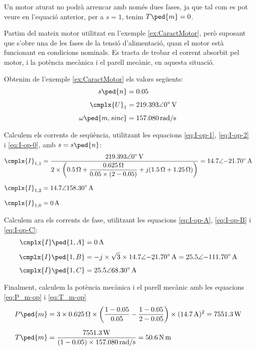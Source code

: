 	    
Un motor aturat no podrà arrencar amb només dues fases, ja que tal com es pot veure en l'equació anterior, per a  $s=1$, tenim $T\ped{m}=0$.	    

	
\begin{exemple}\label{ex:MotorFaseOberta}
\addcontentsxms{\MotorFaseOberta}
	Partim del mateix motor utilitzat en l'exemple \vref{ex:CaractMotor}, però suposant que s'obre una de les fases de la tensió d'alimentació, quan el motor està funcionant en condicions nominals. Es tracta de trobar el corrent absorbit pel motor, i la potència mecànica i el parell mecànic, en aquesta situació.
	
	Obtenim de l'exemple \ref{ex:CaractMotor} els valors següents:
	\begin{align*}
		s\ped{n} &= \num{0,05} \\[1ex]
		\cmplx{U}_1 &=  \complexqty{219,393:0}{V} \\[1ex]
		\omega\ped{m,sinc} &= \qty{157,080}{rad/s}
	\end{align*}

	Calculem els corrents de seqüència, utilitzant les equacions \eqref{eq:I-op-1}, \eqref{eq:I-op-2} i \eqref{eq:I-op-0}, amb $s = s\ped{n}$:
	\begin{align*}
		\cmplx{I}_{1,1} &= \frac{\complexqty{219,393:0}{V}}{2\times \left(\qty{0,5}{\ohm} + \dfrac{\qty{0,625}{\ohm}}{\num{0,05}\times(2-\num{0,05})} + j (\qty{1,5}{\ohm}+\qty{1,25}{\ohm}) \right)} = \complexqty{14,7:-21,70}{A} \\[1.5ex]
		\cmplx{I}_{1,2}  &=  \complexqty{14,7:158,30}{A} \\[1.5ex]
		\cmplx{I}_{1,0}  &= \qty{0}{A}
	\end{align*}
	
	Calculem ara els corrents de fase, utilitzant les equacions \eqref{eq:I-op-A}, \eqref{eq:I-op-B} i \eqref{eq:I-op-C}:
	\begin{align*}
		\cmplx{I}\ped{1,A} &= \qty{0}{A} \\[1ex]
		\cmplx{I}\ped{1,B}  &=  -j \times\sqrt{3} \times \complexqty{14,7:-21,70}{A} =  \complexqty{25,5:-111,70}{A}  \\[1ex]
		\cmplx{I}\ped{1,C}  &= \complexqty{25,5:68,30}{A}   
	\end{align*}
	
	Finalment, calculem la potència mecànica i el parell mecànic amb les equacions \eqref{eq:P_m-op} i \eqref{eq:T_m-op}
	\begin{align*}
		P\ped{m} &= 3\times \qty{0,625}{\ohm} \times \left(\frac{1-\num{0,05}}{\num{0,05}} - \frac{1-\num{0,05}}{2-\num{0,05}} \right) \times (\qty{14,7}{A})^2  = \qty{7551,3}{W}\\[1.5ex]
		T\ped{m} &= \frac{\qty{7551,3}{W}}{(1-\num{0,05}) \times \qty{157,080}{rad/s}}  = \qty{50,6}{N.m}
	\end{align*}
	

\end{exemple}

